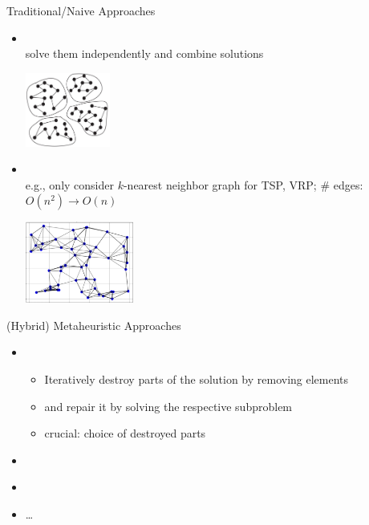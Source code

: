 \documentclass[aspectratio=1610]{beamer}
\newcommand{\important}[1]{{\color{green!60!black}#1}}
\begin{document}
\begin{frame}{Traditional/Naive Approaches}
	\begin{itemize}
	\item{\\
		solve them independently and combine solutions}\\
		\begin{center}
			\includegraphics[width=0.22\textwidth]{graphics/partition.jpg}
		\end{center}
	\item<2>{}\\
		e.g., only consider $k$-nearest neighbor graph for TSP, VRP; \# edges: $O(n^2)\rightarrow O(n)$\\
		\begin{center}
			\includegraphics[width=0.28\textwidth]{graphics/kNN-graph.jpg}
		\end{center}
	\end{itemize}
\end{frame}

\begin{frame}{(Hybrid) Metaheuristic Approaches}
	\begin{itemize}
		\itemsep5ex
		\item {}\\
		\begin{itemize}
			\item Iteratively \important{destroy} parts of the solution by removing elements
			\item and \important{repair} it by solving the respective subproblem
			\item \alert{crucial:} choice of destroyed parts
		\end{itemize}
		\item {} \citep{blum-16b}
		\item {} \citep{taillard-02}
		\item \ldots
	\end{itemize}
\end{frame}
\end{document}
